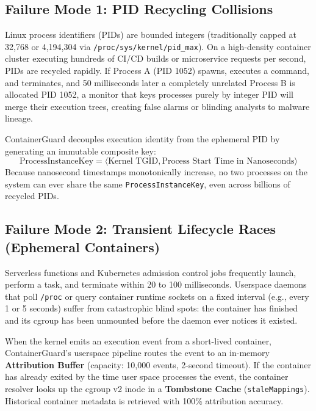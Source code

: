 \documentclass[11pt,a4paper]{article}
\begin{document}
\subsection{Failure Mode 1: PID Recycling Collisions}
Linux process identifiers (PIDs) are bounded integers (traditionally capped at 32,768 or 4,194,304 via \texttt{/proc/sys/kernel/pid\_max}). On a high-density container cluster executing hundreds of CI/CD builds or microservice requests per second, PIDs are recycled rapidly. 
If Process A (PID 1052) spawns, executes a command, and terminates, and 50 milliseconds later a completely unrelated Process B is allocated PID 1052, a monitor that keys processes purely by integer PID will merge their execution trees, creating false alarms or blinding analysts to malware lineage.

\begin{conceptbox}
ContainerGuard decouples execution identity from the ephemeral PID by generating an immutable composite key:
\[
\text{ProcessInstanceKey} = \langle \text{Kernel TGID}, \text{Process Start Time in Nanoseconds} \rangle
\]
Because nanosecond timestamps monotonically increase, no two processes on the system can ever share the same \texttt{ProcessInstanceKey}, even across billions of recycled PIDs.
\end{conceptbox}

\subsection{Failure Mode 2: Transient Lifecycle Races (Ephemeral Containers)}
Serverless functions and Kubernetes admission control jobs frequently launch, perform a task, and terminate within 20 to 100 milliseconds. 
Userspace daemons that poll \texttt{/proc} or query container runtime sockets on a fixed interval (e.g., every 1 or 5 seconds) suffer from catastrophic blind spots: the container has finished and its cgroup has been unmounted before the daemon ever notices it existed.

\begin{conceptbox}
When the kernel emits an execution event from a short-lived container, ContainerGuard's userspace pipeline routes the event to an in-memory \textbf{Attribution Buffer} (capacity: 10,000 events, 2-second timeout). If the container has already exited by the time user space processes the event, the container resolver looks up the cgroup v2 inode in a \textbf{Tombstone Cache} (\texttt{staleMappings}). Historical container metadata is retrieved with 100\% attribution accuracy.
\end{conceptbox}
\end{document}
